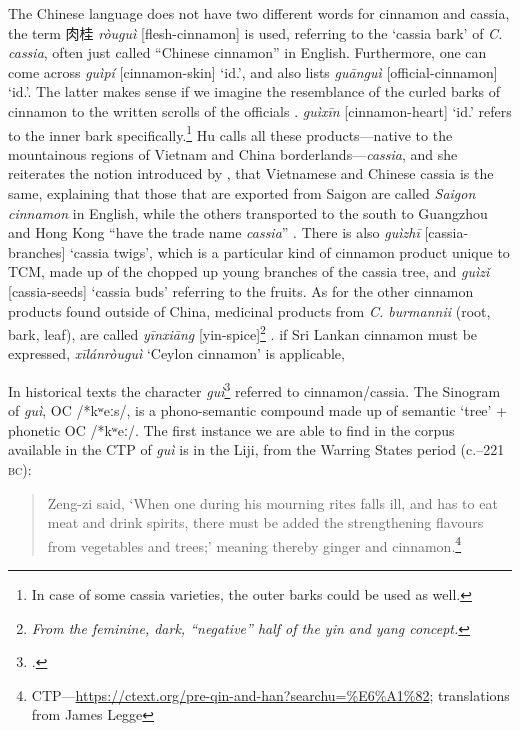 The Chinese language does not have two different words for cinnamon and cassia, the term 肉桂 \textit{ròuguì} [flesh-cinnamon] is used, referring to the `cassia bark' of \textit{C. cassia}, often just called ``Chinese cinnamon'' in English. Furthermore, one can come across  \textit{guìpí} [cinnamon-skin] `id.', and \textcite[399]{hu_food_2005} also lists  \textit{guānguì} [official-cinnamon] `id.'. The latter makes sense if we imagine the resemblance of the curled barks of cinnamon to the written scrolls of the officials \autocite[see][732]{zhang_dictionary_2015}.  \textit{guìxīn} [cinnamon-heart] `id.' refers to the inner bark specifically.\footnote{In case of some cassia varieties, the outer barks could be used as well.} Hu calls all these products---native to the mountainous regions of Vietnam and China borderlands---\textit{cassia}, and she reiterates the notion introduced by \autocite{ravindran_cinnamon_2004}, that Vietnamese and Chinese cassia is the same, explaining that those that are exported from Saigon are called \textit{Saigon cinnamon} in English, while the others transported to the south to Guangzhou and Hong Kong ``have the trade name \textit{cassia}'' \autocite[400]{hu_food_2005}. There is also  \textit{guìzhī} [cassia-branches] `cassia twigs', which is a particular kind of cinnamon product unique to \gls{TCM}, made up of the chopped up young branches of the cassia tree, and  \textit{guìzǐ} [cassia-seeds] `cassia buds' referring to the fruits. As for the other cinnamon products found outside of China, medicinal products from \textit{C. burmannii} (root, bark, leaf), are called  \textit{yīnxiāng} [yin-spice]\footnote{\textit{From the feminine, dark, ``negative'' half of the yin and yang concept.}} \autocite[179]{hu_enumeration_1999}.
if Sri Lankan cinnamon must be expressed,  \textit{xīlánròuguì} `Ceylon cinnamon' is applicable, 

In historical texts the character  \textit{guì}\footcite[s.v. 桂]{sturgeon_chinese_2021} referred to cinnamon/cassia. The Sinogram of \textit{guì}, \gls{OC} /*kʷeːs/, is a phono-semantic compound made up of semantic  `tree' + phonetic  \gls{OC} /*kʷeː/. 
The first instance we are able to find in the corpus available in the \gls{CTP} of \textit{guì} is in the \gls{Liji}, from the Warring States period (c.--221 \textsc{bc}):



\begin{quote}
    Zeng-zi said, `When one during his mourning rites falls ill, and has to eat meat and drink spirits, there must be added the strengthening flavours from vegetables and trees;' meaning thereby ginger and cinnamon.\footnote{\gls{CTP}---\url{https://ctext.org/pre-qin-and-han?searchu=\%E6\%A1\%82}; translations from James Legge}
\end{quote}

